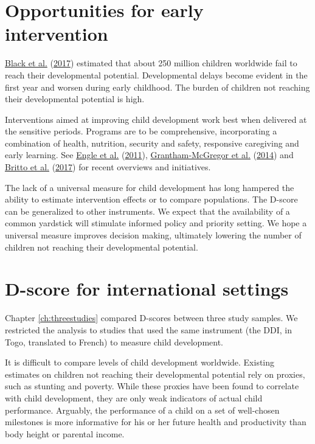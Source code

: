 \documentclass[
]{book}
\begin{document}
\hypertarget{opportunities-for-early-intervention}{%
\section{Opportunities for early intervention}\label{opportunities-for-early-intervention}}

\protect\hyperlink{ref-black2017}{Black et al.} (\protect\hyperlink{ref-black2017}{2017}) estimated that about 250 million children worldwide fail to reach their developmental potential. Developmental delays become evident in the first year and worsen during early childhood. The burden of children not reaching their developmental potential is high.

Interventions aimed at improving child development work best when delivered at the sensitive periods. Programs are to be comprehensive, incorporating a combination of health, nutrition, security and safety, responsive caregiving and early learning. See \protect\hyperlink{ref-engle2011}{Engle et al.} (\protect\hyperlink{ref-engle2011}{2011}), \protect\hyperlink{ref-grantham2014}{Grantham‐McGregor et al.} (\protect\hyperlink{ref-grantham2014}{2014}) and \protect\hyperlink{ref-britto2017}{Britto et al.} (\protect\hyperlink{ref-britto2017}{2017}) for recent overviews and initiatives.

The lack of a universal measure for child development has long hampered the ability to estimate intervention effects or to compare populations. The D-score can be generalized to other instruments. We expect that the availability of a common yardstick will stimulate informed policy and priority setting. We hope a universal measure improves decision making, ultimately lowering the number of children not reaching their developmental potential.

\hypertarget{d-score-for-international-settings}{%
\section{D-score for international settings}\label{d-score-for-international-settings}}

Chapter \ref{ch:threestudies} compared D-scores between three study samples. We restricted the analysis to studies that used the same instrument (the DDI, in Togo, translated to French) to measure child development.

It is difficult to compare levels of child development worldwide. Existing estimates on children not reaching their developmental potential rely on proxies, such as stunting and poverty. While these proxies have been found to correlate with child development, they are only weak indicators of actual child performance. Arguably, the performance of a child on a set of well-chosen milestones is more informative for his or her future health and productivity than body height or parental income.
\end{document}
